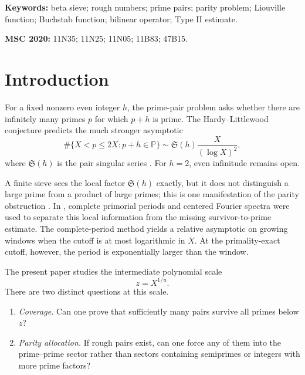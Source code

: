 \documentclass[11pt]{article}
\theoremstyle{definition}
\theoremstyle{remark}
\newcommand{\PP}{\mathbb P}
\begin{document}
\noindent\textbf{Keywords:} beta sieve; rough numbers; prime pairs; parity problem; Liouville function; Buchstab function; bilinear operator; Type II estimate.

\medskip
\noindent\textbf{MSC 2020:} 11N35; 11N25; 11N05; 11B83; 47B15.

\section{Introduction}

For a fixed nonzero even integer $h$, the prime-pair problem asks whether there are infinitely many primes $p$ for which $p+h$ is prime.  The Hardy--Littlewood conjecture predicts the much stronger asymptotic
\begin{equation}\label{eq:hl-intro}
 \#\{X<p\le2X:p+h\in\PP\}
 \sim \mathfrak S(h)\frac{X}{(\log X)^2},
\end{equation}
where $\mathfrak S(h)$ is the pair singular series \citep{HardyLittlewood1923}.  For $h=2$, even infinitude remains open.

A finite sieve sees the local factor $\mathfrak S(h)$ exactly, but it does not distinguish a large prime from a product of large primes; this is one manifestation of the parity obstruction \citep{HeathBrown1982,FriedlanderIwaniec2010}.  In \citet{WangTwoScale2026}, complete primorial periods and centered Fourier spectra were used to separate this local information from the missing survivor-to-prime estimate.  The complete-period method yields a relative asymptotic on growing windows when the cutoff is at most logarithmic in $X$.  At the primality-exact cutoff, however, the period is exponentially larger than the window.

The present paper studies the intermediate polynomial scale
\begin{equation}\label{eq:polynomial-cutoff-intro}
 z=X^{1/u}.
\end{equation}
There are two distinct questions at this scale.

\begin{enumerate}[label=\textbf{G\arabic*.},leftmargin=3.2em]
 \item \emph{Coverage.} Can one prove that sufficiently many pairs survive all primes below $z$?
 \item \emph{Parity allocation.} If rough pairs exist, can one force any of them into the prime--prime sector rather than sectors containing semiprimes or integers with more prime factors?
\end{enumerate}
\end{document}
